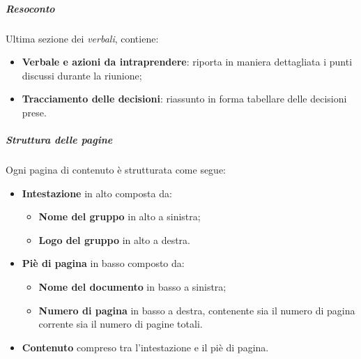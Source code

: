           \subparagraph*{Resoconto}
          Ultima sezione dei \textit{verbali}, contiene:
          \begin{itemize}
              \item \textbf{Verbale e azioni da intraprendere}: riporta in maniera dettagliata i punti discussi durante la riunione;
              \item \textbf{Tracciamento delle decisioni}: riassunto in forma tabellare delle decisioni prese.
          \end{itemize}

          \subparagraph{Struttura delle pagine}
          Ogni pagina di contenuto è strutturata come segue:
          \begin {itemize}
    \item \textbf{Intestazione} in alto composta da:
          \begin {itemize}
    \item \textbf{Nome del gruppo} in alto a sinistra;
    \item \textbf{Logo del gruppo} in alto a destra.
\end{itemize}
\item \textbf{Piè di pagina} in basso composto da:
\begin{itemize}
\item \textbf{Nome del documento} in basso a sinistra;
\item \textbf{Numero di pagina} in basso a destra, contenente sia il numero di pagina corrente sia il numero di pagine totali.
\end {itemize}
\item \textbf{Contenuto} compreso tra l'intestazione e il piè di pagina.
\end {itemize}





